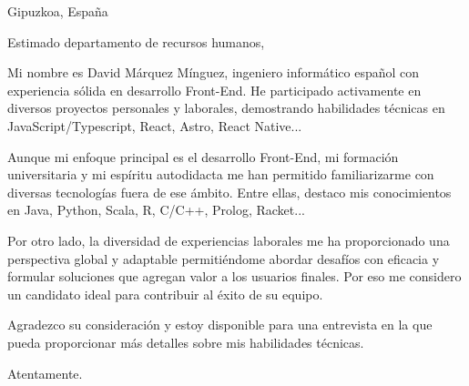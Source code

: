 \documentclass[letterpaper,11pt]{letter}
\begin{document}
\begin{letter}{Gipuzkoa, España}
\address{C/Zarautz 84, 20018 San Sebastián}

\opening{Estimado departamento de recursos humanos,}

Mi nombre es David Márquez Mínguez, ingeniero informático español con experiencia sólida en desarrollo Front-End. He participado activamente en diversos 
proyectos personales y laborales, demostrando habilidades técnicas en JavaScript/Typescript, React, Astro, React Native...

Aunque mi enfoque principal es el desarrollo Front-End, mi formación universitaria y mi espíritu autodidacta me han permitido familiarizarme con diversas tecnologías 
fuera de ese ámbito. Entre ellas, destaco mis conocimientos en Java, Python, Scala, R, C/C++, Prolog, Racket...

Por otro lado, la diversidad de experiencias laborales me ha proporcionado una perspectiva global y adaptable permitiéndome abordar desafíos con eficacia y formular
soluciones que agregan valor a los usuarios finales. Por eso me considero  un candidato ideal para contribuir al éxito de su equipo.

Agradezco su consideración y estoy disponible para una entrevista en la que pueda proporcionar más detalles sobre mis habilidades técnicas.

\signature{\vspace{-35pt}David Márquez Mínguez}
\closing{Atentamente.}


\end{letter}
\end{document}
